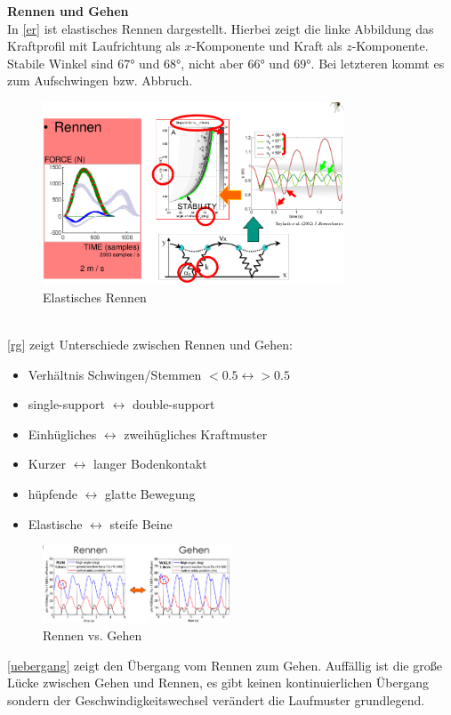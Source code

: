 \noindent
\textbf{Rennen und Gehen}\\
In \autoref{er} ist elastisches Rennen dargestellt. Hierbei zeigt die linke Abbildung das Kraftprofil mit Laufrichtung als $x$-Komponente und Kraft als $z$-Komponente. Stabile Winkel sind 67° und 68°, nicht aber 66° und 69°. Bei letzteren kommt es zum Aufschwingen bzw. Abbruch.
\begin{figure}[h!]
	\centering
	\includegraphics[width=0.8\textwidth]{figures/ch06_rennen.png}
	\caption{Elastisches Rennen}
	\label{er}
\end{figure}\\
\autoref{rg} zeigt Unterschiede zwischen Rennen und Gehen:
\begin{itemize}
\item Verhältnis Schwingen/Stemmen $<0.5 \leftrightarrow >0.5$
\item single-support $\leftrightarrow$ double-support
\item Einhügliches $\leftrightarrow$ zweihügliches Kraftmuster
\item Kurzer $\leftrightarrow$ langer Bodenkontakt
\item hüpfende $\leftrightarrow$ glatte Bewegung
\item Elastische $\leftrightarrow$ steife Beine
\end{itemize}
\begin{figure}[h!]
	\centering
	\includegraphics[width=0.5\textwidth]{figures/ch06_uebergang1.png}
	\caption{Rennen vs. Gehen}
	\label{rg}
\end{figure}
\noindent
\autoref{uebergang} zeigt den Übergang vom Rennen zum Gehen. Auffällig ist die große Lücke zwischen Gehen und Rennen, es gibt keinen kontinuierlichen Übergang sondern der Geschwindigkeitswechsel verändert die Laufmuster grundlegend.

